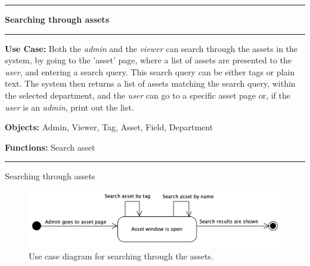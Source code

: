\begin{use_case}[H]
    \hrule
    \vskip 0.3cm
    \Large
    \begin{center}
    
        \textbf{Searching through assets}
        
    \end{center}
    \vskip 0.1cm
    \hrule
    \vskip 0.2cm
    \normalsize
    
    \textbf{Use Case:} Both the \textit{admin} and the \textit{viewer} can search through the assets in the system, by going to the 'asset' page, where a list of assets are presented to the \textit{user}, and entering a search query. This search query can be either tags or plain text. The system then returns a list of assets matching the search query, within the selected department, and the \textit{user} can go to a specific asset page or, if the \textit{user} is an \textit{admin}, print out the list.
    
    \vskip 0.2cm
    
    \textbf{Objects:} Admin, Viewer, Tag, Asset, Field, Department
    
    \vskip 0.2cm
    
    \textbf{Functions:} Search asset
    
    \vskip 0.4cm
    \hrule
    \vskip 0.2cm
    \caption{Searching through assets} \label{use_case:searching_through_assets}
\end{use_case}

\begin{figure}[H]
    \centering
    \includegraphics[width=1.0\textwidth]{figures/SearchAssets.png}
    \caption{Use case diagram for searching through the assets.}
    \label{fig:UseCaseSearchAssets}
\end{figure}


